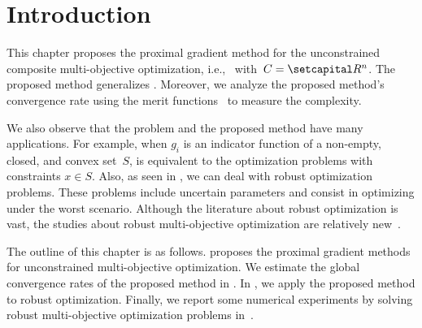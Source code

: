 \documentclass[../main]{subfiles}
\begin{document}
\section{Introduction} 
This chapter proposes the proximal gradient method for the unconstrained composite multi-objective optimization, i.e.,~ with~$C = \setR^n$.
The proposed method generalizes .
Moreover, we analyze the proposed method's convergence rate using the merit functions~ to measure the complexity.

We also observe that the problem and the proposed method have many applications. 
For example, when $g_i$ is an indicator function of a non-empty, closed, and convex set~$S$,  is equivalent to the optimization problems with constraints $x \in S$.
Also, as seen in , we can deal with robust optimization problems. These problems include uncertain parameters and consist in optimizing under the worst scenario. Although the literature about robust optimization is vast, the studies about robust multi-objective optimization are relatively new~\cite{Ehrgott2014,Fliege2014,Morishita2016}.

The outline of this chapter is as follows.
 proposes the proximal gradient methods for unconstrained multi-objective optimization.
We estimate the global convergence rates of the proposed method in .
In , we apply the proposed method to robust optimization.
Finally, we report some numerical experiments by solving robust multi-objective optimization problems in~.
\end{document}
